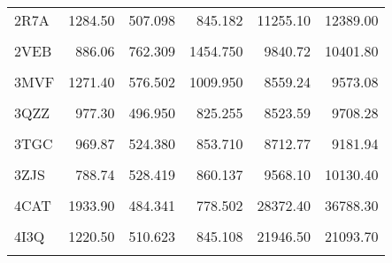 \begin{table}
{\begin{tabular}{lrrrrr}
				2R7A & 1284.50 & 507.098 & 845.182 & 11255.10 & 12389.00\\
				\cellcolor{gray!6}{2SPL} & \cellcolor{gray!6}{1055.70} & \cellcolor{gray!6}{589.706} & \cellcolor{gray!6}{1029.660} & \cellcolor{gray!6}{7588.36} & \cellcolor{gray!6}{8105.94}\\
				2VEB & 886.06 & 762.309 & 1454.750 & 9840.72 & 10401.80\\
				\addlinespace
				\cellcolor{gray!6}{3HX9} & \cellcolor{gray!6}{1844.50} & \cellcolor{gray!6}{785.442} & \cellcolor{gray!6}{1168.200} & \cellcolor{gray!6}{5819.08} & \cellcolor{gray!6}{7189.03}\\
				3MVF & 1271.40 & 576.502 & 1009.950 & 8559.24 & 9573.08\\
				\cellcolor{gray!6}{3QZN} & \cellcolor{gray!6}{726.52} & \cellcolor{gray!6}{664.858} & \cellcolor{gray!6}{1221.330} & \cellcolor{gray!6}{6133.24} & \cellcolor{gray!6}{7179.49}\\
				3QZZ & 977.30 & 496.950 & 825.255 & 8523.59 & 9708.28\\
				\cellcolor{gray!6}{3SIK} & \cellcolor{gray!6}{492.15} & \cellcolor{gray!6}{498.621} & \cellcolor{gray!6}{823.565} & \cellcolor{gray!6}{6495.38} & \cellcolor{gray!6}{7739.06}\\
				\addlinespace
				3TGC & 969.87 & 524.380 & 853.710 & 8712.77 & 9181.94\\
				\cellcolor{gray!6}{3VP5} & \cellcolor{gray!6}{1094.60} & \cellcolor{gray!6}{602.790} & \cellcolor{gray!6}{1050.820} & \cellcolor{gray!6}{9801.82} & \cellcolor{gray!6}{10810.80}\\
				3ZJS & 788.74 & 528.419 & 860.137 & 9568.10 & 10130.40\\
				\cellcolor{gray!6}{4B8N} & \cellcolor{gray!6}{841.27} & \cellcolor{gray!6}{569.302} & \cellcolor{gray!6}{990.216} & \cellcolor{gray!6}{4560.39} & \cellcolor{gray!6}{5458.66}\\
				4CAT & 1933.90 & 484.341 & 778.502 & 28372.40 & 36788.30\\
				\addlinespace
				\cellcolor{gray!6}{4CDP} & \cellcolor{gray!6}{1053.70} & \cellcolor{gray!6}{1425.050} & \cellcolor{gray!6}{3141.090} & \cellcolor{gray!6}{14733.50} & \cellcolor{gray!6}{15887.40}\\
				4I3Q & 1220.50 & 510.623 & 845.108 & 21946.50 & 21093.70\\
				\cellcolor{gray!6}{4JET} & \cellcolor{gray!6}{1010.80} & \cellcolor{gray!6}{495.992} & \cellcolor{gray!6}{818.131} & \cellcolor{gray!6}{7887.81} & \cellcolor{gray!6}{8695.85}\\

\end{tabular}}
\end{table}
